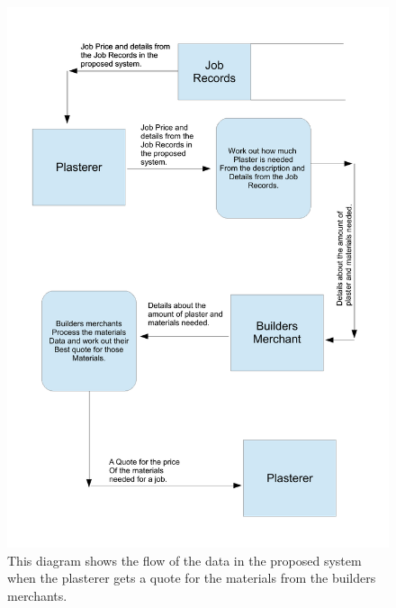 \begin{figure}[H]
\includegraphics[width=\textwidth]{./Analysis/images/proposedSystemGettingQuoteFromBuildersMerchant.pdf}
    \caption{This diagram shows the flow of the data in the proposed system when the plasterer gets a quote for the materials from the builders merchants.} \label{fig:proposed_system_dfd_4}
\end{figure}


